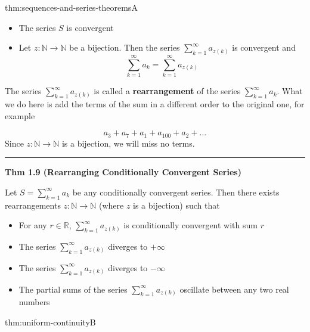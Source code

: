 \documentclass[landscape, 8pt]{extarticle}
\begin{document}
\begin{multicols}{3}
\begin{thm}{thm:sequences-and-series-theorems}{A}
	\begin{itemize}
		\setlength\itemsep{0em}
		\item The series $S$ is convergent

		\item Let $z:\mathbb{N}\to \mathbb{N}$ be a bijection. Then the series $\sum_{k=1}^{\infty} a_{z(k)}$ is convergent and
			\vspace{-5pt}
			\[\sum_{k=1}^{\infty} a_{k} = \sum_{k=1}^{\infty} a_{z(k)} \]
	\end{itemize}

	\vspace{-5pt}
	The series $\sum_{k=1}^{\infty} a_{z(k)}$ is called a \textbf{rearrangement} of the series $\sum_{k=1}^{\infty} a_{k}$. What we do here is add the terms of the sum in a different order to the original one, for example

	\vspace{-8pt}
	\[a_{3} + a_{7}+ a_{1}+ a_{100} + a_{2} + \dots\]
	Since $z:\mathbb{N}\to \mathbb{N}$ is a bijection, we will miss no terms.

	\vspace{-5pt}
	\noindent\rule{\textwidth}{0.2pt}
	\textbf{Thm 1.9 (Rearranging Conditionally Convergent Series)}

	Let $S = \sum_{k=1}^{\infty} a_{k}$ be any conditionally convergent series. Then there exists rearrangements $z:\mathbb{N}\to \mathbb{N}$ (where $z$ is a bijection) such that

	\vspace{-5pt}
	\begin{itemize}[leftmargin=*]
		\setlength\itemsep{0em}
		\item For any $r\in\mathbb{R}$, $\sum_{k=1}^{\infty} a_{z(k)}$ is conditionally convergent with sum $r$

		\item The series $\sum_{k=1}^{\infty} a_{z(k)}$ diverges to $+\infty$

		\item The series $\sum_{k=1}^{\infty} a_{z(k)}$ diverges to $-\infty$

		\item The partial sums of the series $\sum_{k=1}^{\infty} a_{z(k)}$ oscillate between any two real numbers

	\end{itemize}

\end{thm}



\begin{thm}{thm:uniform-continuity}{B}


\end{thm}
\end{multicols}
\end{document}
